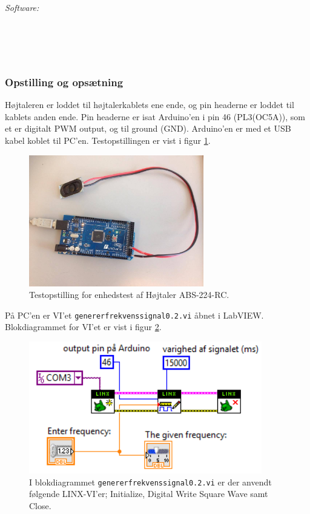 		\textit{Software:}\\
		\labview\\
		\visa\\
		\vi\\
		\ardsw\
	
		\subsubsection{Opstilling og opsætning}
		Højtaleren er loddet til højtalerkablets ene ende, og pin headerne er loddet til kablets anden ende. 
		Pin headerne er isat Arduino'en i pin 46 (PL3(OC5A)), som et er digitalt PWM output, og til ground (GND). 
		Arduino'en er med et USB kabel koblet til PC'en. Testopstillingen er vist i figur \ref{fig:etha}.\\ 
	  
			\begin{figure}[htb]
			\centering
				\includegraphics[width=3in]{haArduino}
				\caption{Testopstilling for enhedstest af Højtaler ABS-224-RC.}	
				\label{fig:etha}
			\end{figure}
	
		På PC'en er VI'et \texttt{genererfrekvenssignal0.2.vi} åbnet i LabVIEW. Blokdiagrammet for VI'et er vist i figur \ref{fig:bdgenerer}.   \\   
	
			\begin{figure}[htb]
			\centering
				\includegraphics[width=4in]{genererfrekvenssignal02}
				\caption{I blokdiagrammet \texttt{genererfrekvenssignal0.2.vi} er der anvendt følgende LINX-VI'er; Initialize, Digital Write Square Wave samt Close.}	
				\label{fig:bdgenerer}
			\end{figure}	  
	
